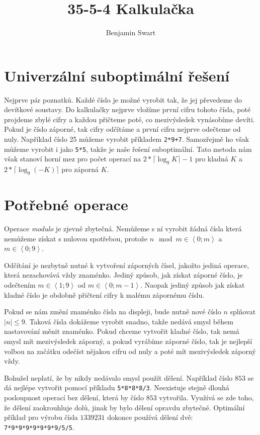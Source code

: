 \documentclass{article}
\title{35-5-4 Kalkulačka}
\author{Benjamin Swart}
\begin{document}
\maketitle

\section{Univerzální suboptimální řešení}

Nejprve pár poznatků. Každé číslo je možné vyrobit tak, že jej převedeme do devítkové soustavy. Do kalkulačky nejprve vložíme první cifru tohoto čísla, poté projdeme zbylé cifry a každou přičteme poté, co mezivýsledek vynásobíme devíti. Pokud je číslo záporné, tak cifry odčítáme a první cifru nejprve odečteme od nuly. Například číslo 25 můžeme vyrobit příkladem \texttt{2*9+7}. Samozřejmě ho však můžeme vyrobit i jako \texttt{5*5}, takže je naše řešení suboptimální. Tato metoda nám však stanoví horní mez pro počet operací na $2 * \lceil\log_9 K\rceil - 1$ pro kladná $K$ a $2 * \lceil\log_9 \left(-K\right)\rceil$ pro záporná $K$.

\section{Potřebné operace}
\label{needed}

Operace \textit{modulo} je zjevně zbytečná. Nemůžeme s ní vyrobit žádná čísla která nemůžeme získat s nulovou spotřebou, protože $n \mod m \in \left<0; m\right>$ a $m \in \left<0; 9\right>$.

Odčítání je nezbytně nutné k vytvoření záporných čísel, jakožto jediná operace, která nezachovává vždy znaménko. Jediný způsob, jak získat záporné číslo, je odečtením $m \in \left<1; 9\right>$ od $m \in \left<0; m - 1\right>$. Naopak jediný způsob jak získat kladné číslo je obdobně přičtení cifry k malému zápornému číslu.

Pokud se nám změní znaménko čísla na displeji, bude nutně nové číslo $n$ splňovat $|n| \leq 9$. Taková čísla dokážeme vyrobit snadno, takže nedává smysl během nastavování měnit znaménko. Pokud chceme vytvořit kladné číslo, tak nemá smysl mít mezivýsledek záporný, a pokud vyrábíme záporné číslo, tak je nejlepší volbou na začátku odečíst nějakou cifru od nuly a poté mít mezivýsledek záporný vždy.

Bohužel neplatí, že by nikdy nedávalo smysl použít dělení. Například číslo $853$ se dá nejlépe vytvořit pomocí příkladu \texttt{5*8*8*8/3}. Neexistuje stejně dlouhá posloupnost operací bez dělení, která by číslo $853$ vytvořila. Využívá se zde toho, že dělení zaokrouhluje dolů, jinak by bylo dělení opravdu zbytečné. Optimální příklad pro výrobu čísla $1339231$ dokonce používá dělení dvě: \texttt{7*9*9*9*9*9*9*9/5/5}.
\end{document}

